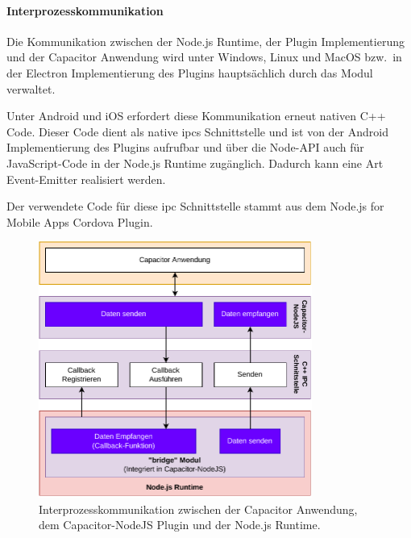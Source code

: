 \newpage

\paragraph{Interprozesskommunikation}

Die Kommunikation zwischen der Node.js Runtime, der Plugin Implementierung und der Capacitor Anwendung wird unter Windows, Linux und MacOS bzw.\ in der Electron Implementierung des Plugins hauptsächlich durch das  Modul verwaltet.
\cite{electron:docs}

Unter Android und iOS erfordert diese Kommunikation erneut nativen C++ Code.
Dieser Code dient als native \acp{ipc} Schnittstelle und ist von der Android Implementierung des Plugins aufrufbar und über die Node-API auch für JavaScript-Code in der Node.js Runtime zugänglich.
Dadurch kann eine Art Event-Emitter realisiert werden.
\cite{nodejs-mobile-cordova, nodejs}

Der verwendete Code für diese \ac{ipc} Schnittstelle stammt aus dem Node.js for Mobile Apps Cordova Plugin.
\cite{nodejs-mobile-cordova}

\vspace{1em}

\begin{figure}[H]
    \centering
    \includegraphics[width=0.8\textwidth]{assets/02_Capacitor-NodeJS/03_Interprozesskommunikation.drawio.pdf}
    \caption[Capacitor-NodeJS / Interprozesskommunikation]{Interprozesskommunikation zwischen der Capacitor Anwendung, dem Capacitor-NodeJS Plugin und der Node.js Runtime.}
\end{figure}

